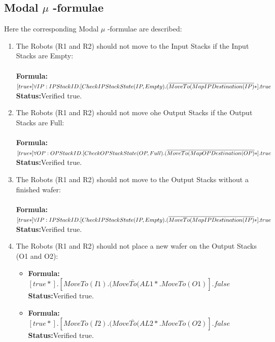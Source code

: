 \documentclass[a4paper,12pt]{article}
\begin{document}
\subsection{Modal $\mu$ -formulae}
Here the corresponding Modal $\mu$ -formulae are described:
\begin{enumerate}

\item The Robots (R1 and R2) should not move to the Input Stacks if the Input Stacks are Empty:
\\
\\\textbf{Formula:} $[true*] \forall IP: IPStackID.[CheckIPStackState(IP, Empty).
\\(\overline{MoveTo(MapIPDestination(IP)}*].true$ \\\textbf{Status:}Verified true.


\item The Robots (R1 and R2) should not move ohe Output Stacks if the Output Stacks are Full:
\\
\\\textbf{Formula:} $[true*] \forall OP: OPStackID.[CheckOPStackState(OP, Full).
\\(\overline{MoveTo(MapOPDestination(OP)}*].true$ \\\textbf{Status:}Verified true.


\item The Robots (R1 and R2) should not move to the Output Stacks without a finished wafer:
\\
\\\textbf{Formula:} $[true*] \forall IP: IPStackID.[CheckIPStackState(IP, Empty).
\\(\overline{MoveTo(MapIPDestination(IP)}*].true$ \\\textbf{Status:}Verified true.


\item The Robots (R1 and R2) should not place a new wafer on the Output Stacks (O1 and O2):
    \begin{itemize}
	\item \textbf{Formula:} $[true*].[MoveTo(I1).(\overline{MoveTo(AL1}*.MoveTo(O1)].false$ \\\textbf{Status:}Verified true.
    \item \textbf{Formula:} $[true*].[MoveTo(I2).(\overline{MoveTo(AL2}*.MoveTo(O2)].false$ \\\textbf{Status:}Verified true.
	\end{itemize}



\end{enumerate}
\end{document}

